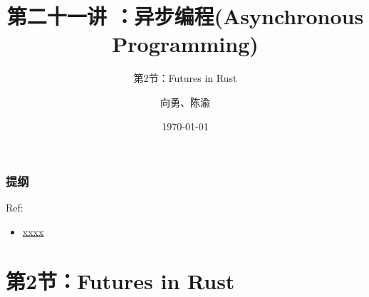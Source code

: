 


\title[第21讲]{第二十一讲 ：异步编程(Asynchronous Programming)} %
\subtitle{第2节：Futures in Rust}
\author{向勇、陈渝} %
\date{\today} %



\begin{frame}
\titlepage %
\end{frame}

\begin{frame}
\frametitle{提纲} %
\tableofcontents %

Ref:
    \begin{itemize}
        \item \href{}{xxxx}
    \end{itemize}

\end{frame}
\section{第2节：Futures in Rust} %

